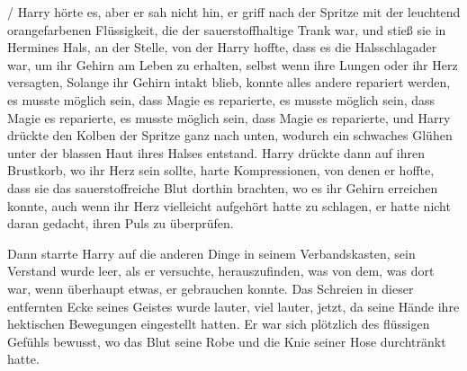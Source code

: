  /  Harry hörte es, aber er sah nicht hin, er griff nach der Spritze mit der leuchtend orangefarbenen Flüssigkeit, die der sauerstoffhaltige Trank war, und stieß sie in Hermines Hals, an der Stelle, von der Harry hoffte, dass es die Halsschlagader war, um ihr Gehirn am Leben zu erhalten, selbst wenn ihre Lungen oder ihr Herz versagten, Solange ihr Gehirn intakt blieb, konnte alles andere repariert werden, es musste möglich sein, dass Magie es reparierte, es musste möglich sein, dass Magie es reparierte, es musste möglich sein, dass Magie es reparierte, und Harry drückte den Kolben der Spritze ganz nach unten, wodurch ein schwaches Glühen unter der blassen Haut ihres Halses entstand. Harry drückte dann auf ihren Brustkorb, wo ihr Herz sein sollte, harte Kompressionen, von denen er hoffte, dass sie das sauerstoffreiche Blut dorthin brachten, wo es ihr Gehirn erreichen konnte, auch wenn ihr Herz vielleicht aufgehört hatte zu schlagen, er hatte nicht daran gedacht, ihren Puls zu überprüfen.

Dann starrte Harry auf die anderen Dinge in seinem Verbandskasten, sein Verstand wurde leer, als er versuchte, herauszufinden, was von dem, was dort war, wenn überhaupt etwas, er gebrauchen konnte. Das Schreien in dieser entfernten Ecke seines Geistes wurde lauter, viel lauter, jetzt, da seine Hände ihre hektischen Bewegungen eingestellt hatten. Er war sich plötzlich des flüssigen Gefühls bewusst, wo das Blut seine Robe und die Knie seiner Hose durchtränkt hatte.

